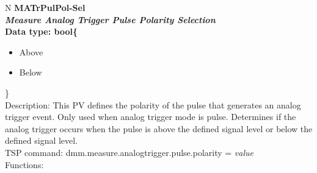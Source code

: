 \documentclass[openany]{article}
\begin{document}
		\begin{tabular}{N}
			\hline
			\bfseries MATrPulPol-Sel\label{pv:matrpulpol-sel} \\ \hline
			\emph{Measure Analog Trigger Pulse Polarity Selection} \\
			Data type: bool\{\begin{itemize}[noitemsep]
				\small
				\item[] Above
				\item[] Below
			\end{itemize}\} \\
			Description: This PV defines the polarity of the pulse that generates an analog trigger event. Only used when analog trigger mode is pulse. Determines if the analog trigger occurs when the pulse is above the defined signal level or below the defined signal level. \\
			TSP command: dmm.measure.analogtrigger.pulse.polarity = \emph{value} \\
			Functions: \\
			\arrayrulecolor{\FuncTableBorderColor}

		\end{tabular}
\end{document}
